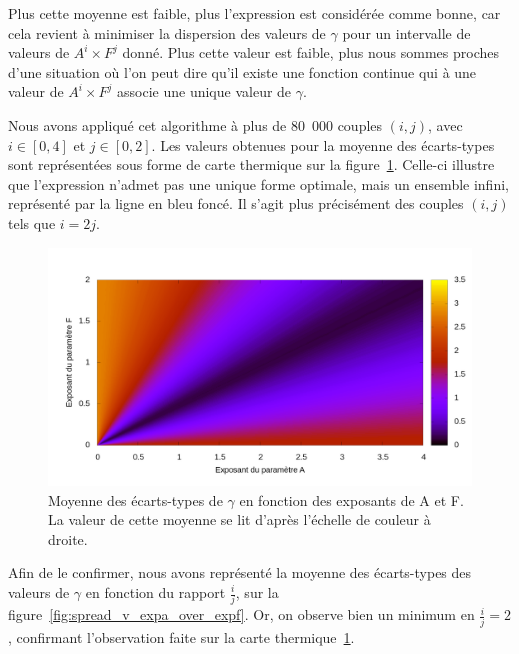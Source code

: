 	Plus cette moyenne est faible, plus l'expression est considérée comme bonne, car cela revient à minimiser la dispersion des valeurs de $\gamma$ pour un intervalle de valeurs de $A^{i}\times{}F^{j}$ donné. Plus cette valeur est faible, plus nous sommes proches d'une situation où l'on peut dire qu'il existe une fonction continue qui à une valeur de $A^{i}\times{}F^{j}$ associe une unique valeur de $\gamma$.
	
	Nous avons appliqué cet algorithme à plus de 80~000 couples $(i,j)$, avec $i \in [0,4]$ et $j \in [0,2]$. Les valeurs obtenues pour la moyenne des écarts-types sont représentées sous forme de carte thermique sur la figure~\ref{fig:spread_v_af}. Celle-ci illustre que l'expression n'admet pas une unique forme optimale, mais un ensemble infini, représenté par la ligne en bleu foncé. Il s'agit plus précisément des couples $(i,j)$ tels que $i = 2j$.
	
	\begin{figure}[!htb]
		\centering
		\includegraphics[width=\textwidth]{figures/ch4/spread_v_af}
		\caption[Moyenne des écarts-types de $\gamma$ en fonction de $i$ et $j$.]{Moyenne des écarts-types de $\gamma$ en fonction des exposants de A et F. La valeur de cette moyenne se lit d'après l'échelle de couleur à droite.}
		\label{fig:spread_v_af}
	\end{figure}
	
	Afin de le confirmer, nous avons représenté la moyenne des écarts-types des valeurs de $\gamma$ en fonction du rapport $\frac{i}{j}$, sur la figure~\ref{fig:spread_v_expa_over_expf}. Or, on observe bien un minimum en $\frac{i}{j} = 2$, confirmant l'observation faite sur la carte thermique~\ref{fig:spread_v_af}.
	
